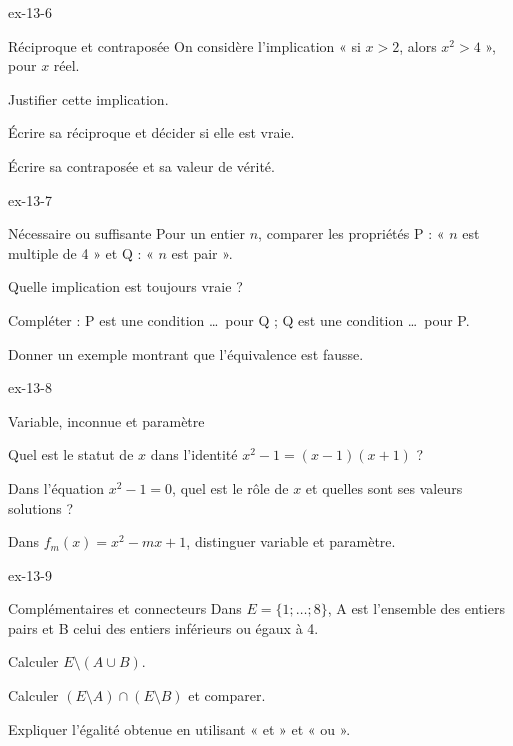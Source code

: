 \clearpage
{}
\begin{blocLivre}{ex-13-6}
\begin{exercice}[2]{Réciproque et contraposée}
On considère l’implication « si $x>2$, alors $x^2>4$ », pour $x$ réel.\begin{questions}
\item Justifier cette implication.
\item Écrire sa réciproque et décider si elle est vraie.
\item Écrire sa contraposée et sa valeur de vérité.
\end{questions}
\end{exercice}
\end{blocLivre}
\begin{blocLivre}{ex-13-7}
\begin{exercice}[2]{Nécessaire ou suffisante}
Pour un entier $n$, comparer les propriétés P : « $n$ est multiple de 4 » et Q : « $n$ est pair ».\begin{questions}
\item Quelle implication est toujours vraie ?
\item Compléter : P est une condition \ldots\ pour Q ; Q est une condition \ldots\ pour P.
\item Donner un exemple montrant que l’équivalence est fausse.
\end{questions}
\end{exercice}
\end{blocLivre}
\begin{blocLivre}{ex-13-8}
\begin{exercice}[2]{Variable, inconnue et paramètre}
\begin{questions}
\item Quel est le statut de $x$ dans l’identité $x^2-1=(x-1)(x+1)$ ?
\item Dans l’équation $x^2-1=0$, quel est le rôle de $x$ et quelles sont ses valeurs solutions ?
\item Dans $f_m(x)=x^2-mx+1$, distinguer variable et paramètre.
\end{questions}
\end{exercice}
\end{blocLivre}
\begin{blocLivre}{ex-13-9}
\begin{exercice}[2]{Complémentaires et connecteurs}
Dans $E=\{1;\ldots;8\}$, A est l’ensemble des entiers pairs et B celui des entiers inférieurs ou égaux à 4.\begin{questions}
\item Calculer $E\setminus(A\cup B)$.
\item Calculer $(E\setminus A)\cap(E\setminus B)$ et comparer.
\item Expliquer l’égalité obtenue en utilisant « et » et « ou ».
\end{questions}
\end{exercice}
\end{blocLivre}
